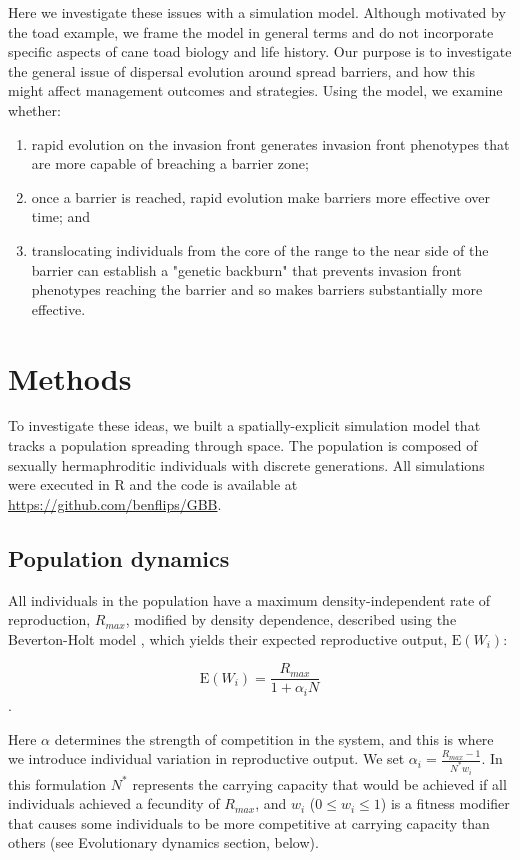\documentclass{article}
\begin{document}
Here we investigate these issues with a simulation model.  Although motivated by the toad example, we frame the model in general terms and do not incorporate specific aspects of cane toad biology and life history. Our purpose is to investigate the general issue of dispersal evolution around spread barriers, and how this might affect management outcomes and strategies.  Using the model, we examine whether:
\begin{enumerate}
\item{} rapid evolution on the invasion front generates invasion front phenotypes that are more capable of breaching a barrier zone;
\item{} once a barrier is reached, rapid evolution make barriers more effective over time; and
\item{} translocating individuals from the core of the range to the near side of the barrier can establish a "genetic backburn" that prevents invasion front phenotypes reaching the barrier and so makes barriers substantially more effective.
\end{enumerate}
    
    
    
    
    

\section{Methods}
To investigate these ideas, we built a spatially-explicit simulation model
that tracks a population spreading through space. The population is
composed of sexually hermaphroditic individuals with discrete
generations. All simulations were executed in R \citep{R_Core_Team_2014} and the code is available at \href{https://github.com/benflips/GBB}{https://github.com/benflips/GBB}.

\subsection{Population dynamics}

All individuals in the population have a maximum density-independent
rate of reproduction, \(R_{max}\), modified by density dependence,
described using the Beverton-Holt model \citep{Beverton_1958}, which yields their expected reproductive output, $\text{E}(W_i)$:

\[ \text{E}(W_i)=\frac{R_{max}}{1+\alpha_i N}\].

Here \(\alpha\) determines the strength of competition in the system,
and this is where we introduce individual variation in reproductive
output. We set \(\alpha_i=\frac{R_{max}-1}{N^* w_i}\). In this
formulation \(N^*\) represents the carrying capacity that would be
achieved if all individuals achieved a fecundity of \(R_{max}\), and
\(w_i\) (\(0\leq w_i \leq 1\)) is a fitness modifier that causes some
individuals to be more competitive at carrying capacity than others (see
Evolutionary dynamics section, below).
\end{document}

